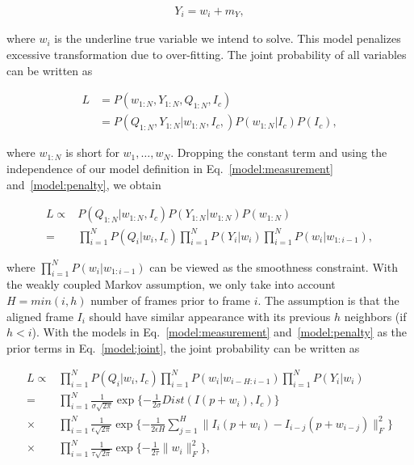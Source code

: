\documentclass[review]{elsarticle}
\begin{document}
\begin{align}
\label{model:penalty}
Y_i=w_i+m_Y,
\end{align}

\noindent where $w_i$ is the underline true variable we intend to solve. This model penalizes excessive transformation due to over-fitting. The joint probability of all variables can be written as

\begin{equation}
\begin{aligned}
L&=P(w_{1:N},Y_{1:N},Q_{1:N},I_c) \\
&=P(Q_{1:N},Y_{1:N}|w_{1:N},I_c,)P(w_{1:N}|I_c)P(I_c),
\end{aligned}
\end{equation}

\noindent where $w_{1:N}$ is short for $w_1,\ldots,w_N$. Dropping the constant term and using the independence of our model definition in Eq.~\eqref{model:measurement} and~\eqref{model:penalty}, we obtain

\begin{equation}
\begin{aligned}
L\propto & P(Q_{1:N}|w_{1:N},I_c) P(Y_{1:N}|w_{1:N}) P(w_{1:N}) \\
=& \prod_{i=1}^N{P(Q_i|w_i,I_c)} \prod_{i=1}^N{P(Y_i|w_i)} \prod_{i=1}^N {P(w_i|w_{1:i-1})},
\label{model:joint}
\end{aligned}
\end{equation}

\noindent where $\prod_{i=1}^N {P(w_i|w_{1:i-1})}$ can be viewed as the smoothness constraint. With the weakly coupled Markov assumption, we only take into account $H=min(i,h)$ number of frames prior to frame $i$. The assumption is that the aligned frame $I_i$ should have similar appearance with its previous $h$ neighbors (if $h<i$). With the models in Eq.~\eqref{model:measurement} and~\eqref{model:penalty} as the prior terms in Eq.~\eqref{model:joint}, the joint probability can be written as 

\begin{align}
L\propto & \prod_{i=1}^N{P(Q_i|w_i,I_c)} \prod_{i=1}^N {P(w_i|w_{i-H:i-1})} \prod_{i=1}^N{P(Y_i|w_i)} \\
\label{data_exp}
=& \prod_{i=1}^N \frac{1}{\sigma \sqrt{2\pi}} \exp\{-\frac{1}{2\sigma}Dist(I(p+w_i),I_c)\}  \\
\label{smooth_exp}
\times &\prod_{i=1}^N \frac{1}{\epsilon \sqrt{2\pi}} \exp\{-\frac{1}{2\epsilon H}\sum_{j=1}^{H}\parallel{I_i(p+w_i)-I_{i-j}(p+w_{i-j})}\parallel_F^2\} \\
\label{penalty_exp}
\times &\prod_{i=1}^N \frac{1}{\tau \sqrt{2\pi}} \exp\{-\frac{1}{2\tau}\parallel{w_i}\parallel_F^2\},
\end{align}
\end{document}
